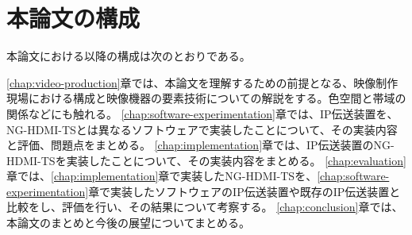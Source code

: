 
\section{本論文の構成}
本論文における以降の構成は次のとおりである。

\ref{chap:video-production}章では、本論文を理解するための前提となる、映像制作現場における構成と映像機器の要素技術についての解説をする。色空間と帯域の関係などにも触れる。
\ref{chap:software-experimentation}章では、IP伝送装置を、NG-HDMI-TSとは異なるソフトウェアで実装したことについて、その実装内容と評価、問題点をまとめる。
\ref{chap:implementation}章では、IP伝送装置のNG-HDMI-TSを実装したことについて、その実装内容をまとめる。
\ref{chap:evaluation}章では、\ref{chap:implementation}章で実装したNG-HDMI-TSを、\ref{chap:software-experimentation}章で実装したソフトウェアのIP伝送装置や既存のIP伝送装置と比較をし、評価を行い、その結果について考察する。
\ref{chap:conclusion}章では、本論文のまとめと今後の展望についてまとめる。

